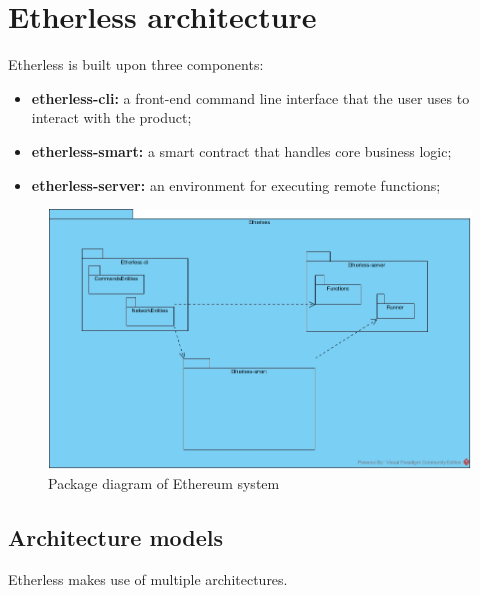 \section{Etherless architecture}
Etherless is built upon three components:
\begin{itemize}
	\item \textbf{etherless-cli:} a front-end command line interface that the user uses to interact with the product;
	\item \textbf{etherless-smart:} a smart contract that handles core business logic;
	\item \textbf{etherless-server:} an environment for executing remote functions;
\end{itemize}
\begin{figure}
	\centering
	\includegraphics[width=\textwidth]{res/img/packageDiagram.jpg}
	\caption{Package diagram of Ethereum system}
\end{figure}
\subsection{Architecture models}
Etherless makes use of multiple architectures. 
